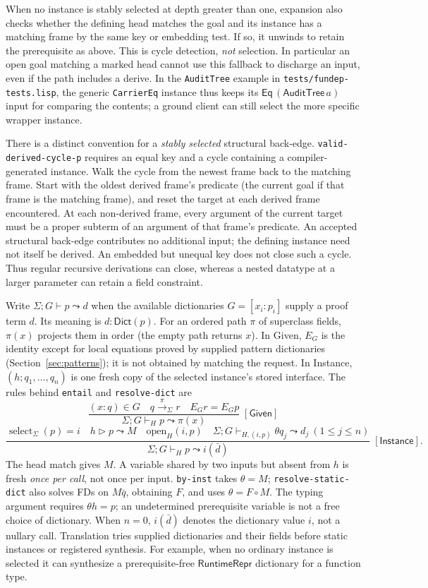 \documentclass[11pt]{article}
\theoremstyle{definition}
\newcommand{\code}[1]{\texttt{#1}}
\newcommand{\src}[1]{\nolinkurl{#1}}
\newcommand{\Dict}{\mathsf{Dict}}
\newcommand{\sel}{\operatorname{select}}
\newcommand{\oneway}{\mathrel{\triangleright}}
\newcommand{\rrule}[3]{\frac{\displaystyle #2}{\displaystyle #3}
                       \;{\scriptstyle[\textsf{#1}]}}
\begin{document}
When no instance is stably selected at depth greater than one, expansion
also checks whether the defining head matches the goal and its instance
has a matching frame by the same key or embedding test. If so, it unwinds
to retain the prerequisite as above. This is cycle detection, \emph{not}
selection. In particular an open goal matching a marked head cannot use
this fallback to discharge an input, even if the path includes a derive.
In the \code{AuditTree} example in \src{tests/fundep-tests.lisp}, the
generic \code{CarrierEq} instance thus keeps its
$\mathsf{Eq}\,(\mathsf{AuditTree}\,a)$ input for comparing the contents;
a ground client can still select the more specific wrapper instance.

There is a distinct convention for a \emph{stably selected} structural back-edge.
\src{valid-derived-cycle-p} requires an equal key and a cycle containing a
compiler-generated instance. Walk the cycle from the newest frame back to
the matching frame. Start with the oldest derived frame's predicate (the
current goal if that frame is the matching frame), and reset the target
at each derived frame encountered. At each non-derived frame, every
argument of the current target must be a proper subterm of an argument
of that frame's predicate. An accepted structural back-edge
contributes no additional input; the defining instance need not itself be
derived. An embedded but unequal key does not close such a cycle. Thus
regular recursive derivations can close, whereas a nested datatype at a
larger parameter can retain a field constraint.

Write $\Sigma;G\vdash p\leadsto d$ when the available dictionaries
$G=[x_i:p_i]$ supply a proof term $d$. Its meaning is $d:\Dict(p)$. For
an ordered path $\pi$ of superclass fields, $\pi(x)$ projects them in
order (the empty path returns $x$). In \textsf{Given}, $E_G$ is the
identity except for local equations proved by supplied pattern dictionaries
(Section~\ref{sec:patterns}); it is not obtained by matching the request.
In \textsf{Instance}, $(h;q_1,\ldots,q_n)$ is one fresh copy of the
selected instance's stored interface. The rules behind \src{entail} and
\src{resolve-dict} are
\[
 \rrule{Given}{(x:q)\in G\quad q\xrightarrow{\pi}_{\Sigma}r\quad E_G r=E_G p}
                {\Sigma;G\vdash_H p\leadsto\pi(x)}
\]
\[
 \rrule{Instance}{\sel_\Sigma(p)=i\quad h\oneway p\leadsto M\quad
       \mathrm{open}_{H}(i,p)\quad
       \Sigma;G\vdash_{H,(i,p)}\theta q_j\leadsto d_j\ (1\le j\le n)}
       {\Sigma;G\vdash_H p\leadsto i(\bar d)} .
\]
The head match gives $M$. A variable shared by two inputs but absent
from $h$ is fresh \emph{once per call}, not once per input.
\src{by-inst} takes $\theta=M$; \src{resolve-static-dict} also solves
FDs on $M\bar q$, obtaining $F$, and uses $\theta=F\circ M$.
The typing argument requires $\theta h=p$; an undetermined prerequisite
variable is not a free choice of dictionary. When $n=0$, $i(\bar d)$
denotes the dictionary value $i$, not a nullary call. Translation tries
supplied dictionaries and their fields before static instances or
registered synthesis. For example, when no ordinary instance is selected
it can synthesize a prerequisite-free $\mathsf{RuntimeRepr}$ dictionary
for a function type.
\end{document}
